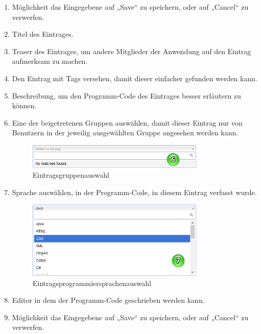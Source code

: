 \begin{enumerate}
\item Möglichkeit das Eingegebene auf „Save“ zu speichern, oder auf „Cancel“ zu verwerfen.
\item Titel des Eintrages.
\item Teaser des Eintrages, um andere Mitglieder der Anwendung auf den Eintrag aufmerksam zu machen.
\item Den Eintrag mit Tags versehen, damit dieser einfacher gefunden werden kann.
\item Beschreibung, um den Programm-Code des Eintrages besser erläutern zu können.
\item Eine der beigetretenen Gruppen auswählen, damit dieser Eintrag nur von Benutzern in der jeweilig ausgewählten Gruppe angesehen werden kann.


\begin{figure}[H]
    \centering
    \includegraphics[width=0.8\textwidth]{Bilder/13.png}
    \caption{Eintragsgruppenauswahl }
    \label{fig:eintragsgruppenauswahl}
\end{figure}



\item Sprache auswählen, in der Programm-Code, in diesem Eintrag verfasst wurde.

\begin{figure}[H]
    \centering
    \includegraphics[width=0.8\textwidth]{Bilder/14.png}
    \caption{Eintragsprogrammiersprachenauswahl }
    \label{fig:eintragsprogrammiersprachenauswahl}
\end{figure}




\item Editor in dem der Programm-Code geschrieben werden kann. 
\item Möglichkeit das Eingegebene auf „Save“ zu speichern, oder auf „Cancel“ zu verwerfen.
\end{enumerate}


